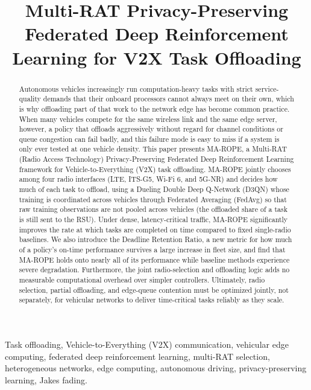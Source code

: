 \documentclass[journal,10pt,twocolumn]{IEEEtran}
\begin{document}
\title{Multi-RAT Privacy-Preserving Federated Deep Reinforcement Learning for V2X Task Offloading}

\maketitle

\begin{abstract}
Autonomous vehicles increasingly run computation-heavy tasks with strict service-quality demands that their onboard processors cannot always meet on their own, which is why offloading part of that work to the network edge has become common practice. When many vehicles compete for the same wireless link and the same edge server, however, a policy that offloads aggressively without regard for channel conditions or queue congestion can fail badly, and this failure mode is easy to miss if a system is only ever tested at one vehicle density. This paper presents MA-ROPE, a Multi-RAT (Radio Access Technology) Privacy-Preserving Federated Deep Reinforcement Learning framework for Vehicle-to-Everything (V2X) task offloading. MA-ROPE jointly chooses among four radio interfaces (LTE, ITS-G5, Wi-Fi 6, and 5G-NR) and decides how much of each task to offload, using a Dueling Double Deep Q-Network (D3QN) whose training is coordinated across vehicles through Federated Averaging (FedAvg) so that raw training observations are not pooled across vehicles (the offloaded share of a task is still sent to the RSU). Under dense, latency-critical traffic, MA-ROPE significantly improves the rate at which tasks are completed on time compared to fixed single-radio baselines. We also introduce the Deadline Retention Ratio, a new metric for how much of a policy's on-time performance survives a large increase in fleet size, and find that MA-ROPE holds onto nearly all of its performance while baseline methods experience severe degradation. Furthermore, the joint radio-selection and offloading logic adds no measurable computational overhead over simpler controllers. Ultimately, radio selection, partial offloading, and edge-queue contention must be optimized jointly, not separately, for vehicular networks to deliver time-critical tasks reliably as they scale.
\end{abstract}
\begin{IEEEkeywords}
Task offloading, Vehicle-to-Everything (V2X) communication, vehicular edge computing, federated deep reinforcement learning, multi-RAT selection, heterogeneous networks, edge computing, autonomous driving, privacy-preserving learning, Jakes fading.
\end{IEEEkeywords}
\end{document}

